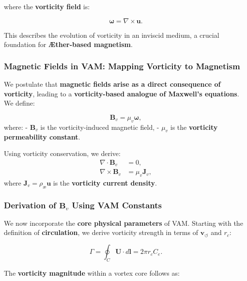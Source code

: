 \documentclass[a4paper,10pt]{article}
\begin{document}
    where the \textbf{vorticity field} is:

    \begin{equation*}
        \boldsymbol{\omega} = \nabla \times \boldsymbol{u}.
    \end{equation*}

    This describes the evolution of vorticity in an inviscid medium, a crucial foundation for \textbf{Æther-based magnetism}.

    \subsubsection*{Magnetic Fields in VAM: Mapping Vorticity to Magnetism}
    We postulate that \textbf{magnetic fields arise as a direct consequence of vorticity}, leading to a \textbf{vorticity-based analogue of Maxwell's equations}. We define:

    \begin{equation*}
        \boldsymbol{B}_v = \mu_v \boldsymbol{\omega},
    \end{equation*}
    where:
    - \( \boldsymbol{B}_v \) is the vorticity-induced magnetic field,
    - \( \mu_v \) is the \textbf{vorticity permeability constant}.

    Using vorticity conservation, we derive:
    \begin{align}
        \nabla \cdot \boldsymbol{B}_v &= 0, \\
        \nabla \times \boldsymbol{B}_v &= \mu_v \boldsymbol{J}_v,
    \end{align}
    where \( \boldsymbol{J}_v = \rho_\text{\ae} \boldsymbol{u} \) is the \textbf{vorticity current density}.

    \subsubsection*{Derivation of \( \boldsymbol{B}_v \) Using VAM Constants}
    We now incorporate the \textbf{core physical parameters} of VAM. Starting with the definition of \textbf{circulation}, we derive vorticity strength in terms of \( \mathbf{v}_{\scriptscriptstyle\boldsymbol{\circlearrowleft}} \) and \( r_c \):

    \begin{equation*}
        \Gamma = \oint_C \mathbf{U} \cdot d\mathbf{l} = 2\pi r_c C_e.
    \end{equation*}

    The \textbf{vorticity magnitude} within a vortex core follows as:
\end{document}
